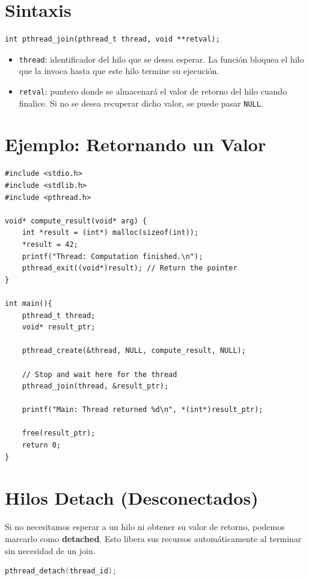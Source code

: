 \documentclass[12pt,a4paper]{article}
\begin{document}
\section{Sintaxis}
\begin{lstlisting}[numbers=none]
int pthread_join(pthread_t thread, void **retval);
\end{lstlisting}

\begin{itemize}
    \item \texttt{thread}: identificador del hilo que se desea esperar. 
    La función bloquea el hilo que la invoca hasta que este hilo termine su ejecución.

    \item \texttt{retval}: puntero donde se almacenará el valor de retorno del hilo
    cuando finalice. Si no se desea recuperar dicho valor, se puede pasar
    \texttt{NULL}.
\end{itemize}

\newpage

\section{Ejemplo: Retornando un Valor}
\begin{lstlisting}
#include <stdio.h>
#include <stdlib.h>
#include <pthread.h>

void* compute_result(void* arg) {
    int *result = (int*) malloc(sizeof(int));
    *result = 42;
    printf("Thread: Computation finished.\n");
    pthread_exit((void*)result); // Return the pointer
}

int main(){
    pthread_t thread;
    void* result_ptr;

    pthread_create(&thread, NULL, compute_result, NULL);

    // Stop and wait here for the thread
    pthread_join(thread, &result_ptr);

    printf("Main: Thread returned %d\n", *(int*)result_ptr);
    
    free(result_ptr);
    return 0;
}
\end{lstlisting}

\section{Hilos Detach (Desconectados)}
Si no necesitamos esperar a un hilo ni obtener su valor de retorno, podemos marcarlo como \textbf{detached}. Esto libera sus recursos automáticamente al terminar sin necesidad de un join.
\begin{lstlisting}[language=C, numbers=none]
pthread_detach(thread_id);
\end{lstlisting}
\end{document}
